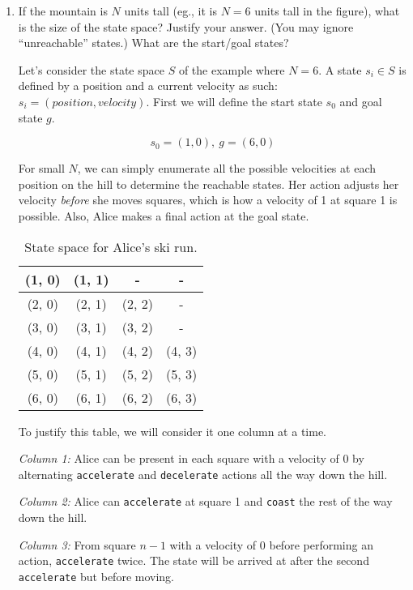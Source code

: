 \documentclass[fleqn]{hermans-hw}
\begin{document}
\begin{enumerate}
\item If the mountain is $N$ units tall (eg., it is $N=6$ units tall in
the figure), what is the size of the state space?  Justify your
answer.  (You may ignore ``unreachable'' states.)  What are the
start/goal states?

Let's consider the state space $S$ of the example where $N = 6$. A state $s_i \in S$ is defined by a position and a current velocity as such: $s_i = (position, velocity)$. First we will define the start state $s_0$ and goal state $g$.

$$s_0 = (1, 0), \ g = (6, 0)$$

For small $N$, we can simply enumerate all the possible velocities at each position on the hill to determine the reachable states. Her action adjusts her velocity \textit{before} she moves squares, which is how a velocity of 1 at square 1 is possible. Also, Alice makes a final action at the goal state.

\begin{table}[H]
\centering
{\renewcommand{\arraystretch}{1.2}%
\begin{tabular}{| c | c | c | c |}
\hline
(1, 0) & (1, 1) & - & - \\ \hline
(2, 0) & (2, 1) & (2, 2) & - \\ \hline
(3, 0) & (3, 1) & (3, 2) & - \\ \hline
(4, 0) & (4, 1) & (4, 2) & (4, 3) \\ \hline
(5, 0) & (5, 1) & (5, 2) & (5, 3) \\ \hline
(6, 0) & (6, 1) & (6, 2) & (6, 3) \\ \hline
\end{tabular}}
\caption{State space for Alice's ski run.}
\end{table}

To justify this table, we will consider it one column at a time. 

\textit{Column 1:} Alice can be present in each square with a velocity of 0 by alternating \texttt{accelerate} and \texttt{decelerate} actions all the way down the hill.

\textit{Column 2:} Alice can \texttt{accelerate} at square 1 and \texttt{coast} the rest of the way down the hill.

\textit{Column 3:} From square $n - 1$ with a velocity of 0 before performing an action, \texttt{accelerate} twice. The state will be arrived at after the second \texttt{accelerate} but before moving.


\end{enumerate}
\end{document}
